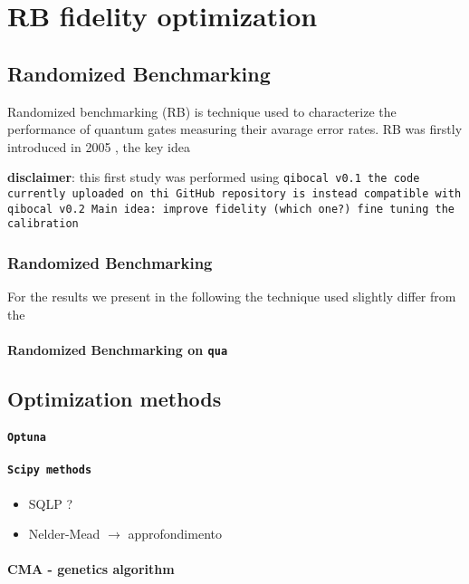 \section{RB fidelity optimization}

\subsection{Randomized Benchmarking}
Randomized benchmarking (RB) is technique used to characterize the performance of quantum gates measuring their avarage error rates.
RB was firstly introduced in 2005 \cite{Emerson_2005_RB}, the key idea 

\textbf{disclaimer}: this first study was performed using \tt{qibocal v0.1} the code currently uploaded on thi GitHub repository is instead compatible with \tt{qibocal v0.2}
Main idea: improve fidelity (which one?) fine tuning the calibration

\subsubsection{Randomized Benchmarking}
For the results we present in the following the technique used slightly differ from the 
\paragraph{Randomized Benchmarking on \tt{qua}} %

\subsection{Optimization methods}
\paragraph{\tt{Optuna}}
\cite{Optuna}
\paragraph{\tt{Scipy} methods}
\cite{Scipy}
\begin{itemize}
    \item SQLP ?
    \item Nelder-Mead $\rightarrow$ approfondimento
\end{itemize}
\paragraph{CMA - genetics algorithm}
\cite{CMA}

